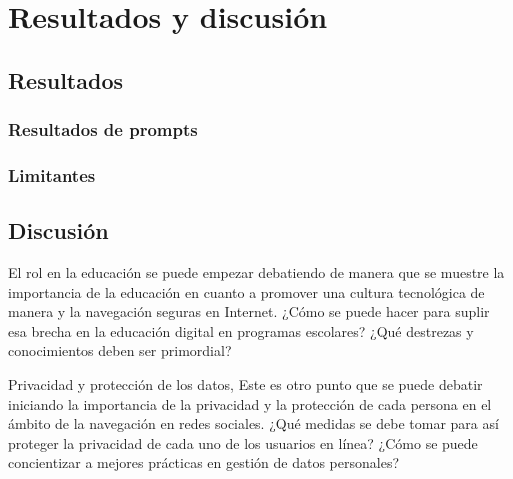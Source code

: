 \chapter{Resultados	y discusión}\label{cap:capitulo5}
\section{Resultados}\label{section:Resultados}


\subsection{Resultados de prompts}\label{section:Resultados}

\subsection{Limitantes}\label{section:Resultados}
\section{Discusión }\label{section:Discusión}
El rol en la educación se puede empezar debatiendo de manera que se muestre la importancia de la educación en cuanto a promover una cultura tecnológica de manera y la navegación seguras en Internet. ¿Cómo se puede hacer para suplir esa brecha en la educación digital en programas escolares? ¿Qué destrezas y conocimientos deben ser primordial?

Privacidad y protección de los datos, Este es otro punto que se puede debatir iniciando la importancia de la privacidad y la protección de cada persona en el ámbito de la navegación en redes sociales. ¿Qué medidas se debe tomar para así proteger la privacidad de cada uno de los usuarios en línea? ¿Cómo se puede concientizar a mejores prácticas en gestión de datos personales?